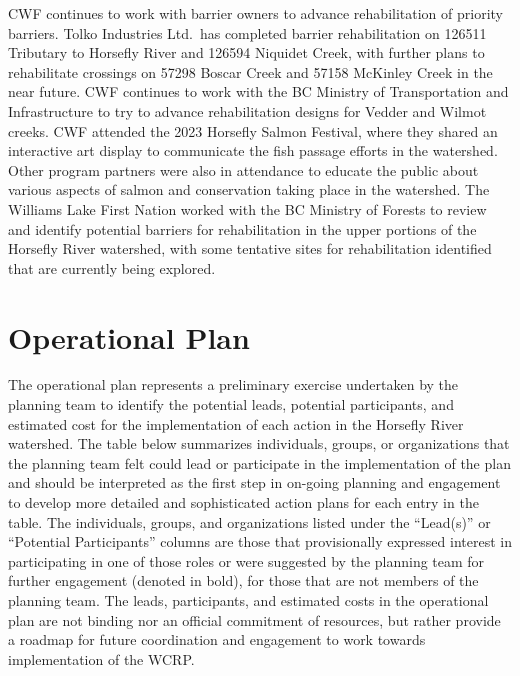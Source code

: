 \documentclass[
  letterpaper,
  DIV=11,
  numbers=noendperiod]{scrreprt}
\begin{document}
CWF continues to work with barrier owners to advance rehabilitation of
priority barriers. Tolko Industries Ltd.~has completed barrier
rehabilitation on 126511 Tributary to Horsefly River and 126594 Niquidet
Creek, with further plans to rehabilitate crossings on 57298 Boscar
Creek and 57158 McKinley Creek in the near future. CWF continues to work
with the BC Ministry of Transportation and Infrastructure to try to
advance rehabilitation designs for Vedder and Wilmot creeks. CWF
attended the 2023 Horsefly Salmon Festival, where they shared an
interactive art display to communicate the fish passage efforts in the
watershed. Other program partners were also in attendance to educate the
public about various aspects of salmon and conservation taking place in
the watershed. The Williams Lake First Nation worked with the BC
Ministry of Forests to review and identify potential barriers for
rehabilitation in the upper portions of the Horsefly River watershed,
with some tentative sites for rehabilitation identified that are
currently being explored.

\section*{Operational Plan}\label{operational-plan}


The operational plan represents a preliminary exercise undertaken by the
planning team to identify the potential leads, potential participants,
and estimated cost for the implementation of each action in the Horsefly
River watershed. The table below summarizes individuals, groups, or
organizations that the planning team felt could lead or participate in
the implementation of the plan and should be interpreted as the first
step in on-going planning and engagement to develop more detailed and
sophisticated action plans for each entry in the table. The individuals,
groups, and organizations listed under the ``Lead(s)'' or ``Potential
Participants'' columns are those that provisionally expressed interest
in participating in one of those roles or were suggested by the planning
team for further engagement (denoted in bold), for those that are not
members of the planning team. The leads, participants, and estimated
costs in the operational plan are not binding nor an official commitment
of resources, but rather provide a roadmap for future coordination and
engagement to work towards implementation of the WCRP.
\end{document}
